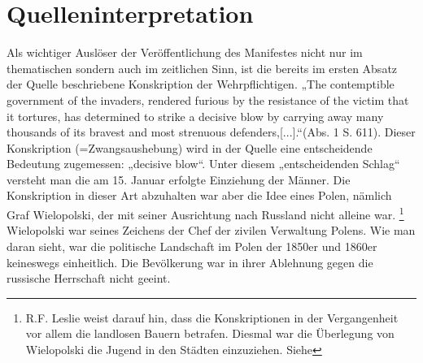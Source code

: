 \documentclass[12pt,headsepline,a4paper]{scrartcl}
\begin{document}
\section{Quelleninterpretation}
Als wichtiger Auslöser der Veröffentlichung des Manifestes nicht nur im thematischen sondern auch
im zeitlichen Sinn, ist die bereits im ersten Absatz der Quelle beschriebene Konskription der
Wehrpflichtigen. „The contemptible government of the invaders, rendered furious by the resistance
of the victim that it tortures, has determined to strike a decisive blow by carrying away many
thousands of its bravest and most strenuous defenders,[...].“(Abs. 1 S. 611). Dieser Konskription
(=Zwangsaushebung) wird in der Quelle eine entscheidende Bedeutung zugemessen: „decisive
blow“. Unter diesem „entscheidenden Schlag“ versteht man die am 15. Januar erfolgte Einziehung
der Männer. Die Konskription in dieser Art abzuhalten war aber die Idee eines Polen, nämlich Graf
Wielopolski, der mit seiner Ausrichtung nach Russland nicht alleine war. \footnote{
R.F. Leslie weist darauf hin, dass die Konskriptionen in der Vergangenheit vor allem die landlosen Bauern betrafen.
Diesmal war die Überlegung von Wielopolski die Jugend in den Städten einzuziehen. 
Siehe }
Wielopolski war seines
Zeichens der Chef der zivilen Verwaltung Polens. Wie man daran sieht, war die politische
Landschaft im Polen der 1850er und 1860er keineswegs einheitlich. Die Bevölkerung war in ihrer
Ablehnung gegen die russische Herrschaft nicht geeint.
\end{document}

